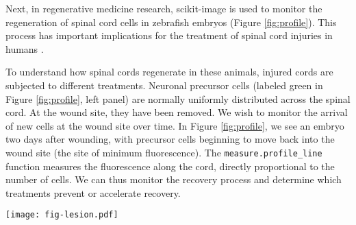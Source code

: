     Next, in regenerative medicine research, scikit-image is used to monitor the regeneration of spinal cord cells in zebrafish embryos (Figure \ref{fig:profile}). This process has important implications for the treatment of spinal cord injuries in humans \citep{Bhatt04,Thuret06}.

    To understand how spinal cords regenerate in these animals, injured cords are subjected to different treatments. Neuronal precursor cells (labeled green in Figure \ref{fig:profile}, left panel) are normally uniformly distributed across the spinal cord. At the wound site, they have been removed. We wish to monitor the arrival of new cells at the wound site over time. In Figure \ref{fig:profile}, we see an embryo two days after wounding, with precursor cells beginning to move back into the wound site (the site of minimum fluorescence). The \texttt{measure.profile\_line} function measures the fluorescence along the cord, directly proportional to the number of cells. We can thus monitor the recovery process and determine which treatments prevent or accelerate recovery.

    \begin{figure*}[bht]

      \texttt{[image: fig-lesion.pdf]}

      \caption{The \texttt{measure.profile\_line} function being used to track recovery in spinal cord injuries. \textit{Left}: an image of fluorescently-labeled nerve cells in an injured zebrafish embryo. \textit{Middle}: the automatically determined region of interest. The SciPy library was used to determine the region extent \citep{scipy,scipylib}, and functions from the scikit-image \texttt{draw} module were used to draw it. \textit{Right}: the image intensity along the line of interest, averaged over the displayed width. \label{fig:profile}}
    \end{figure*}
